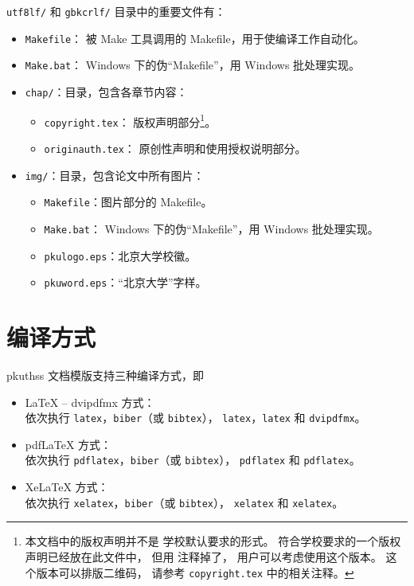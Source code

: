 	\verb|utf8lf/| 和 \verb|gbkcrlf/| 目录中的重要文件有：
	\begin{itemize}
		\item \verb|Makefile|：
			被 Make 工具调用的 Makefile，用于使编译工作自动化。
		\item \verb|Make.bat|：%
			Windows 下的伪“Makefile”，用 Windows 批处理实现。
		\item \verb|chap/|：目录，包含各章节内容：
		\begin{itemize}
			\item \verb|copyright.tex|：
				版权声明部分\footnote{%
					本文档中的版权声明并不是%
					学校默认要求的形式\supercite{pku-copyright}。
					符合学校要求的一个版权声明已经放在此文件中，
					但用 \texttt{\string\iffalse{} ...\ \string\fi} %
					注释掉了，
					用户可以考虑使用这个版本。
					这个版本可以排版二维码，
					请参考 \texttt{copyright.tex} 中的相关注释。
				}。
			\item \verb|originauth.tex|：
				原创性声明和使用授权说明部分\supercite{pku-originauth}。
		\end{itemize}
		\item \verb|img/|：目录，包含论文中所有图片：
		\begin{itemize}
			\item \verb|Makefile|：图片部分的 Makefile。
			\item \verb|Make.bat|：%
				Windows 下的伪“Makefile”，用 Windows 批处理实现。
			\item \verb|pkulogo.eps|：北京大学校徽。
			\item \verb|pkuword.eps|：“北京大学”字样。
		\end{itemize}
	\end{itemize}

	\section{编译方式}\label{sec:compile}

	pkuthss 文档模版支持三种编译方式，即
	\begin{itemize}
		\item \LaTeX{} -- dvipdfmx 方式：\\
			依次执行 \verb|latex|，\verb|biber|（或 \verb|bibtex|），%
			\verb|latex|，\verb|latex| 和 \verb|dvipdfmx|。
		\item pdf\LaTeX{} 方式：\\
			依次执行 \verb|pdflatex|，\verb|biber|（或 \verb|bibtex|），%
			\verb|pdflatex| 和 \verb|pdflatex|。
		\item Xe\LaTeX{} 方式：\\
			依次执行 \verb|xelatex|，\verb|biber|（或 \verb|bibtex|），%
			\verb|xelatex| 和 \verb|xelatex|。\\
	\end{itemize}

